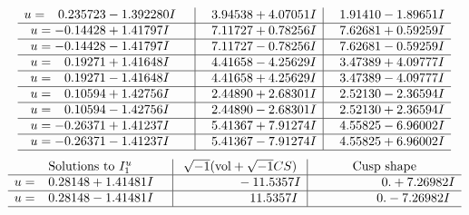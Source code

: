 \documentclass[1p]{elsarticle_modified}
\theoremstyle{definition}
\newcommand{\I}{\sqrt{-1}}
\begin{document}
$$\begin{array}{c|c|c}
\begin{aligned}
u &= \phantom{-}0.235723 - 1.392280 I\end{aligned}
 & \phantom{-}3.94538 + 4.07051 I & \phantom{-}1.91410 - 1.89651 I \\ \hline\begin{aligned}
u &= -0.14428 + 1.41797 I\end{aligned}
 & \phantom{-}7.11727 + 0.78256 I & \phantom{-}7.62681 + 0.59259 I \\ \hline\begin{aligned}
u &= -0.14428 - 1.41797 I\end{aligned}
 & \phantom{-}7.11727 - 0.78256 I & \phantom{-}7.62681 - 0.59259 I \\ \hline\begin{aligned}
u &= \phantom{-}0.19271 + 1.41648 I\end{aligned}
 & \phantom{-}4.41658 - 4.25629 I & \phantom{-}3.47389 + 4.09777 I \\ \hline\begin{aligned}
u &= \phantom{-}0.19271 - 1.41648 I\end{aligned}
 & \phantom{-}4.41658 + 4.25629 I & \phantom{-}3.47389 - 4.09777 I \\ \hline\begin{aligned}
u &= \phantom{-}0.10594 + 1.42756 I\end{aligned}
 & \phantom{-}2.44890 + 2.68301 I & \phantom{-}2.52130 - 2.36594 I \\ \hline\begin{aligned}
u &= \phantom{-}0.10594 - 1.42756 I\end{aligned}
 & \phantom{-}2.44890 - 2.68301 I & \phantom{-}2.52130 + 2.36594 I \\ \hline\begin{aligned}
u &= -0.26371 + 1.41237 I\end{aligned}
 & \phantom{-}5.41367 + 7.91274 I & \phantom{-}4.55825 - 6.96002 I \\ \hline\begin{aligned}
u &= -0.26371 - 1.41237 I\end{aligned}
 & \phantom{-}5.41367 - 7.91274 I & \phantom{-}4.55825 + 6.96002 I\\
 \hline 
 \end{array}$$\newpage$$\begin{array}{c|c|c}  
\text{Solutions to }I^u_{1}& \I (\text{vol} + \sqrt{-1}CS) & \text{Cusp shape}\\
 \hline 
\begin{aligned}
u &= \phantom{-}0.28148 + 1.41481 I\end{aligned}
 & \phantom{-0.000000 } -11.5357 I & \phantom{-0.000000 -}0. + 7.26982 I \\ \hline\begin{aligned}
u &= \phantom{-}0.28148 - 1.41481 I\end{aligned}
 & \phantom{-0.000000 -}11.5357 I & \phantom{-0.000000 } 0. - 7.26982 I\\
 \hline 
 \end{array}$$\newpage
\end{document}
